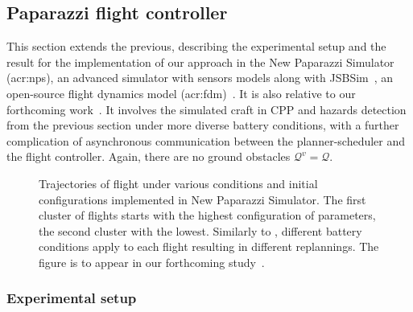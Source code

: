 \subsection{Paparazzi flight controller}
\label{sec:res-papa}

This section extends the previous, describing the experimental setup and the result for the implementation of our approach in the New Paparazzi Simulator (\Gls{acr:nps}), an advanced simulator with sensors models along with JSBSim~\citep{berndt2004jsbsim}, an open-source flight dynamics model (\Gls{acr:fdm})~\citep{papanps}. It is also relative to our forthcoming work~\citep{seewald202Xenergy}. It involves the simulated craft in CPP and hazards detection from the previous section under more diverse battery conditions, with a further complication of asynchronous communication between the planner-scheduler and the flight controller. Again, there are no ground obstacles $\mathcal{Q}^v=\mathcal{Q}$.

\begin{figure}[p!]
  \centering
  \selectfont
  \footnotesize    
  
  \caption[Trajectories of flight under various conditions and initial configurations in New Paparazzi Simulator]{Trajectories of flight under various conditions and initial configurations implemented in New Paparazzi Simulator. The first cluster of flights  starts with the highest configuration of parameters, the second cluster  with the lowest. Similarly to , different battery conditions apply to each flight resulting in different replannings. The figure is to appear in our forthcoming study~\citep{seewald202Xenergy}.}
  \label{fig:trajs-pprz}
\end{figure}

\subsubsection*{Experimental setup}

